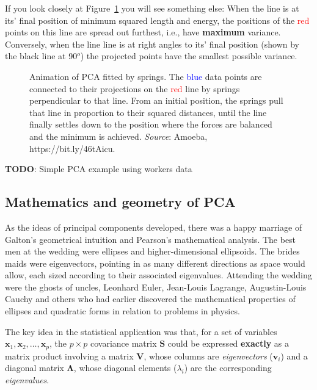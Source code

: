 \documentclass[
  letterpaper,
  10pt,
  krantz2]{krantz}
\begin{document}
If you look closely at Figure~\ref{fig-pca-springs} you will see
something else: When the line is at its' final position of minimum
squared length and energy, the positions of the \textcolor{red}{red}
points on this line are spread out furthest, i.e., have \textbf{maximum}
variance. Conversely, when the line line is at right angles to its'
final position (shown by the black line at 90\(^o\)) the projected
points have the smallest possible variance.

\begin{figure}

{\centering 

}

\caption{\label{fig-pca-springs}Animation of PCA fitted by springs. The
\textcolor{blue}{blue} data points are connected to their projections on
the \textcolor{red}{red} line by springs perpendicular to that line.
From an initial position, the springs pull that line in proportion to
their squared distances, until the line finally settles down to the
position where the forces are balanced and the minimum is achieved.
\emph{Source}: Amoeba, https://bit.ly/46tAicu.}

\end{figure}

\textbf{TODO}: Simple PCA example using workers data

\hypertarget{mathematics-and-geometry-of-pca}{%
\subsection{Mathematics and geometry of
PCA}\label{mathematics-and-geometry-of-pca}}

As the ideas of principal components developed, there was a happy
marriage of Galton's geometrical intuition and Pearson's mathematical
analysis. The best men at the wedding were ellipses and
higher-dimensional ellipsoids. The brides maids were eigenvectors,
pointing in as many different directions as space would allow, each
sized according to their associated eigenvalues. Attending the wedding
were the ghosts of uncles, Leonhard Euler, Jean-Louis Lagrange,
Augustin-Louis Cauchy and others who had earlier discovered the
mathematical properties of ellipses and quadratic forms in relation to
problems in physics.

The key idea in the statistical application was that, for a set of
variables \(\mathbf{x}_1, \mathbf{x}_2, \dots, \mathbf{x}_p\), the
\(p \times p\) covariance matrix \(\mathbf{S}\) could be expressed
\textbf{exactly} as a matrix product involving a matrix \(\mathbf{V}\),
whose columns are \emph{eigenvectors} (\(\mathbf{v}_i\)) and a diagonal
matrix \(\mathbf{\Lambda}\), whose diagonal elements (\(\lambda_i\)) are
the corresponding \emph{eigenvalues}.
\end{document}
